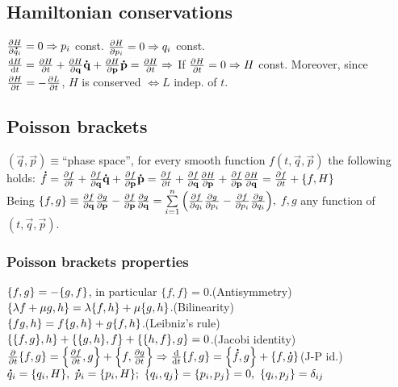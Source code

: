 \subsection{Hamiltonian conservations}
$\pdv{H}{ \accentset{\mbox{\bfseries .}}{q}_{i}}=0\Rightarrow p_{i}$ const. $\pdv{H}{p_{i}}=0\Rightarrow q_{i}$ const.\\
$\frac{\text{d}H}{\text{d}t}=\pdv{H}{t}+\pdv{H}{\mathbf{q}}\accentset{\mbox{\bfseries .}}{\mathbf{q}}+\pdv{H}{\mathbf{p}}\accentset{\mbox{\bfseries .}}{\mathbf{p}}=\pdv{H}{t}\Rightarrow $ If $\pdv{H}{t}=0\Rightarrow H$ const. Moreover, since $\pdv{H}{t}=-\pdv{L}{t}$, $H$ is conserved $\iff L$ indep. of $t$.



\subsection{Poisson brackets}
$(\vec{q},\vec{p})\equiv$``phase space'', for every smooth function $f({t,\vec{q},\vec{p}})$ the following holds: $\dot{f}=\partials{f}{t}+\partials{f}{\vec{q}}\dotv{q}+\partials{f}{\vec{p}}\dotv{p}=\partials{f}{t}+\partials{f}{\vec{q}}\partials{H}{\vec{p}}+\partials{f}{\vec{p}}\partials{H}{\vec{q}}=\partials{f}{t}+\acomm{f}{H}$\\
Being $\acomm{f}{g}\equiv\partials{f}{\vec{q}}\partials{g}{\vec{p}}-\partials{f}{\vec{p}}\partials{g}{\vec{q}}=\sum\limits_{i=1}^{n}\Big(\partials{f}{q_{i}}\partials{g}{p_{i}}-\partials{f}{p_{i}}\partials{g}{q_{i}}\Big),$ $f,g$ any function of $(t,\vec{q},\vec{p})$.



\subsubsection*{Poisson brackets properties}
$\acomm{f}{g}=-\acomm{g}{f}$, in particular $\{f,f\}=0$.\hfill(Antisymmetry)\\
$\acomm{\lambda f+\mu g}{h}=\lambda\acomm{f}{h}+\mu\acomm{g}{h}$.\hfill(Bilinearity)\\
$\acomm{fg}{h}=f\acomm{g}{h}+g\acomm{f}{h}$.\hfill(Leibniz's rule)\\
$\acomm{\acomm{f}{g}}{h}+\acomm{\acomm{g}{h}}{f}+\acomm{\acomm{h}{f}}{g}=0$.\hfill (Jacobi identity)\\
$\partials{}{t}\acomm{f}{g}=\acomm{\partials{f}{t}}{g}+\acomm{f}{\partials{g}{t}}\then \frac{\text{d}}{\text{d}t}\acomm{f}{g}=\acomm{\dot{f}}{g}+\acomm{f}{\dot{g}}$\hfill(J-P id.)
$\dot{q}_{i}=\acomm{q_{i}}{H},\ \dot{p}_{i}=\acomm{p_{i}}{H};\ \acomm{q_{i}}{q_{j}}=\acomm{p_{i}}{p_{j}}=0,\ \acomm{q_{i}}{p_{j}}=\delta_{ij}$


